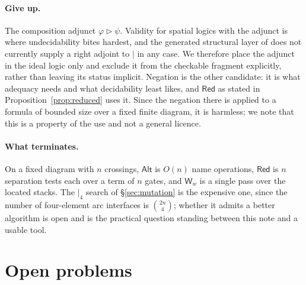 \documentclass[11pt]{article}
\theoremstyle{definition}
\newcommand{\sep}{\mathbin{\vert}}
\newcommand{\ssep}[1]{\mathbin{\vert_{#1}}}
\begin{document}
\paragraph{Give up.}
The composition adjunct $\varphi \triangleright \psi$. Validity for spatial logics
with the adjunct is where undecidability bites hardest, and the generated
structural layer of \cite{omnibus} does not currently supply a right adjoint to
$\sep$ in any case. We therefore place the adjunct in the ideal logic only and
exclude it from the checkable fragment explicitly, rather than leaving its status
implicit. Negation is the other candidate: it is what adequacy needs and what
decidability least likes, and $\mathsf{Red}$ as stated in
Proposition~\ref{prop:reduced} uses it. Since the negation there is applied to a
formula of bounded size over a fixed finite diagram, it is harmless; we note that
this is a property of the use and not a general licence.

\paragraph{What terminates.}
On a fixed diagram with $n$ crossings, $\mathsf{Alt}$ is $O(n)$ name operations,
$\mathsf{Red}$ is $n$ separation tests each over a term of $n$ gates, and
$\mathsf{W}_w$ is a single pass over the located stacks. The $\ssep{4}$ search of
\S\ref{sec:mutation} is the expensive one, since the number of four-element arc
interfaces is $\binom{2n}{4}$; whether it admits a better algorithm is open and is
the practical question standing between this note and a usable tool.

\section{Open problems}
\end{document}
